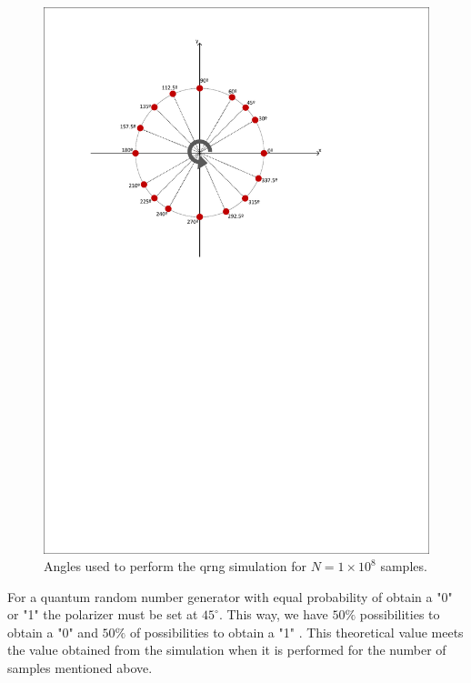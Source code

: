 \begin{figure}[h]
    \centering
        \includegraphics[clip, trim=0.5cm 15.5cm 2.5cm 1cm, width=1.00\textwidth]{./sdf/qrng/figures_raw/sphere.pdf}
    \caption{Angles used to perform the qrng simulation for $N=1 \times 10^{8}$ samples. }\label{sphere}
\end{figure}

For a quantum random number generator with equal probability of obtain a "0" \space or "1" \space the polarizer must be set at $45^{\circ}$. This way, we have $50\%$ possibilities to obtain a "0" \space and $50\%$ of possibilities to obtain a "1" \space. This theoretical value meets the value obtained from the simulation when it is performed for the number of samples mentioned above. 

